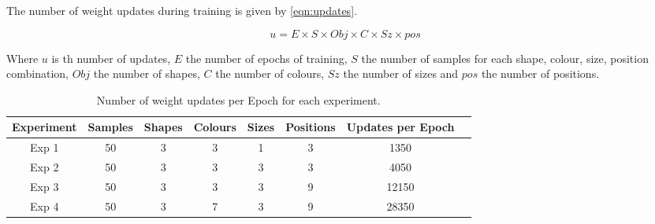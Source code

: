 


The number of weight updates during training is given by \autoref{eqn:updates}.

\begin{equation}\label{eqn:updates}
u = E \times S \times Obj \times C \times Sz \times pos
\end{equation}

Where $u$ is th number of updates, $E$ the number of epochs of training, $S$ the number of samples for each shape, colour, size, position combination, $Obj$ the number of shapes, $C$ the number of colours, $Sz$ the number of sizes and $pos$ the number of positions.


\begin{table}
\centering
\begin{tabular}{|c|c|c|c|c|c|c|c|}
\hline
\textbf{Experiment} & \textbf{Samples} & \textbf{Shapes} & \textbf{Colours} & \textbf{Sizes} & \textbf{Positions} & \textbf{Updates per Epoch} \\ \hline
Exp 1 & 50 & 3 & 3 & 1 & 3 & 1350 \\ \hline
Exp 2 & 50 & 3 & 3 & 3 & 3 & 4050 \\ \hline
Exp 3 & 50 & 3 & 3 & 3 & 9 & 12150 \\ \hline
Exp 4 & 50 & 3 & 7 & 3 & 9 & 28350 \\ \hline

\end{tabular}
\caption{Number of weight updates per Epoch for each experiment.}
\label{tab:updatesperEpoch}
\end{table}

